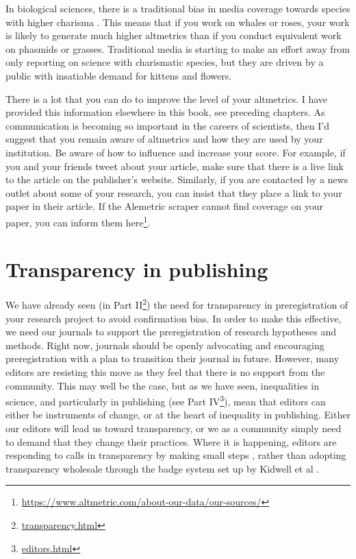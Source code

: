\documentclass[
]{krantz}
\renewcommand{\href}[2]{#2\footnote{\url{#1}}}
\begin{document}
In biological sciences, there is a traditional bias in media coverage towards species with higher charisma \citep{ducarme2013what}. This means that if you work on whales or roses, your work is likely to generate much higher altmetrics than if you conduct equivalent work on phasmids or grasses. Traditional media is starting to make an effort away from only reporting on science with charismatic species, but they are driven by a public with insatiable demand for kittens and flowers.

There is a lot that you can do to improve the level of your altmetrics. I have provided this information elsewhere in this book, see preceding chapters. As communication is becoming so important in the careers of scientists, then I'd suggest that you remain aware of altmetrics and how they are used by your institution. Be aware of how to influence and increase your score. For example, if you and your friends tweet about your article, make sure that there is a live link to the article on the publisher's website. Similarly, if you are contacted by a news outlet about some of your research, you can insist that they place a link to your paper in their article. If the Alemetric scraper cannot find coverage on your paper, you can inform them \href{https://www.altmetric.com/about-our-data/our-sources/}{here}.

\hypertarget{transparency2}{%
\chapter{Transparency in publishing}\label{transparency2}}

We have already seen (\href{transparency.html}{in Part II}) the need for transparency in preregistration of your research project to avoid confirmation bias. In order to make this effective, we need our journals to support the preregistration of research hypotheses and methods. Right now, journals should be openly advocating and encouraging preregistration with a plan to transition their journal in future. However, many editors are resisting this move as they feel that there is no support from the community. This may well be the case, but as we have seen, inequalities in science, and particularly in publishing (see \href{editors.html}{Part IV}), mean that editors can either be instruments of change, or at the heart of inequality in publishing. Either our editors will lead us toward transparency, or we as a community simply need to demand that they change their practices. Where it is happening, editors are responding to calls in transparency by making small steps \citep[for example asking for open coding:][]{powers2019open}, rather than adopting transparency wholesale through the badge system set up by Kidwell et al \citeyearpar{kidwell2016badges}.
\end{document}
